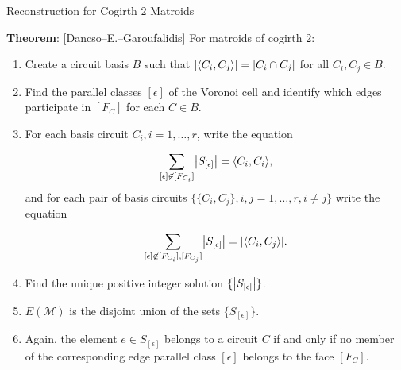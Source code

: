 \documentclass[9pt]{beamer}
\def\calM{\mathcal M}
\renewcommand{\theorem}[1]{\vspace{6pt}\textbf{Theorem}: #1\vspace{6pt}}
\DeclarePairedDelimiter\abs{\lvert}{\rvert}
\DeclarePairedDelimiter\iprod{\langle}{\rangle}
\begin{document}
    \begin{frame}{Reconstruction for Cogirth $2$ Matroids}

        \theorem{[Dancso--E.--Garoufalidis] For matroids of cogirth $2$:}

        \pause

        \vspace{-6pt}
        
        \begin{enumerate}
            \item Create a circuit basis $B$ such that $\abs*{\iprod*{C_i, C_j}}=\abs*{C_i\cap C_j}$ for all $C_i, C_j\in B$.\pause
            \item Find the parallel classes $[\epsilon]$ of the Voronoi cell and identify which edges participate in $[F_C]$ for each $C\in B$.\pause
            \item For each basis circuit $C_i, i=1, \dots, r$, write the equation

            \[\sum_{[\epsilon]\not\in [F_{C_i}]} \abs*{S_{[\epsilon]}}=\iprod*{C_i, C_i},\]
            and for each pair of basis circuits $\{\{C_i, C_j\}, i, j=1, \dots, r, i\neq j\}$ write the equation
            
            \[\sum_{[\epsilon]\not\in [F_{C_i}], [F_{C_j}]} \abs*{S_{[\epsilon]}}=\abs*{\iprod*{C_i, C_j}}.\]\pause
            \item Find the unique positive integer solution $\{\abs*{S_{[\epsilon]}}\}$.\pause
            \item $E(\calM)$ is the disjoint union of the sets $\{S_{[\epsilon]}\}$.\pause
            \item Again, the element $e\in S_{[\epsilon]}$ belongs to a circuit $C$ if and only if no member of the corresponding edge parallel class $[\epsilon]$ belongs to the face $[F_C]$.
        \end{enumerate}
        
    \end{frame}
\end{document}
